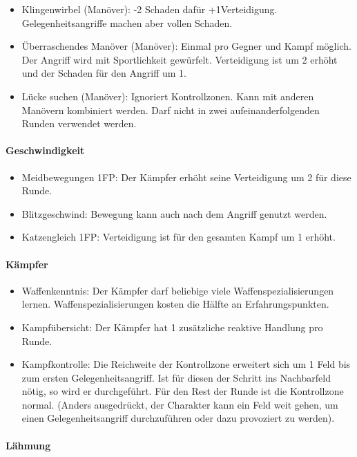 \documentclass{article}
\begin{document}
\begin{itemize}
\item Klingenwirbel (Manöver): -2 Schaden dafür +1Verteidigung. Gelegenheitsangriffe machen aber vollen Schaden.
\item Überraschendes Manöver (Manöver): Einmal pro Gegner und Kampf möglich. Der Angriff wird mit Sportlichkeit gewürfelt. Verteidigung ist um 2 erhöht und der Schaden für den Angriff um 1.
\item Lücke suchen (Manöver): Ignoriert Kontrollzonen. Kann mit anderen Manövern kombiniert werden. Darf nicht in zwei aufeinanderfolgenden Runden verwendet werden.
\end{itemize}

\paragraph{Geschwindigkeit}

\begin{itemize}
\item Meidbewegungen 1FP: Der Kämpfer erhöht seine Verteidigung um 2 für diese Runde.
\item Blitzgeschwind: Bewegung kann auch nach dem Angriff genutzt werden.
\item Katzengleich 1FP: Verteidigung ist für den gesamten Kampf um 1 erhöht.
\end{itemize}

\paragraph{Kämpfer}

\begin{itemize}
\item Waffenkenntnis: Der Kämpfer darf beliebige viele Waffenspezialisierungen lernen. Waffenspezialisierungen kosten die Hälfte an Erfahrungspunkten.
\item Kampfübersicht: Der Kämpfer hat 1 zusätzliche reaktive Handlung pro Runde.
\item Kampfkontrolle: Die Reichweite der Kontrollzone erweitert sich um 1 Feld bis zum ersten Gelegenheitsangriff. Ist für diesen der Schritt ins Nachbarfeld nötig, so wird er durchgeführt. Für den Rest der Runde ist die Kontrollzone normal. (Anders ausgedrückt, der Charakter kann ein Feld weit gehen, um einen Gelegenheitsangriff durchzuführen oder dazu provoziert zu werden).
\end{itemize}

\paragraph{Lähmung }
\end{document}
